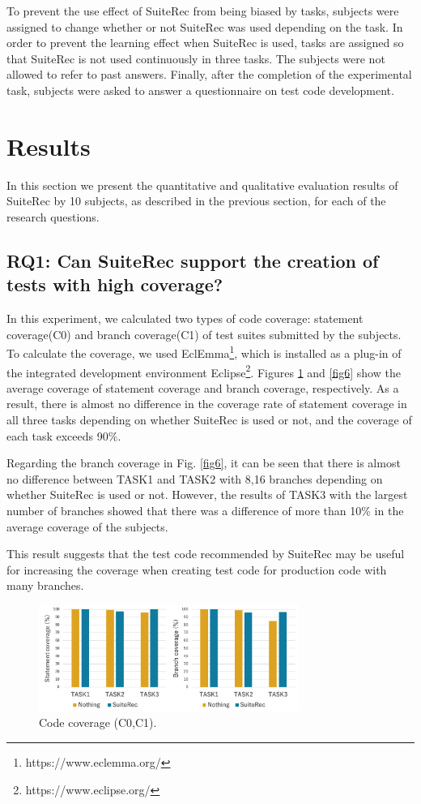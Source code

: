 \documentclass[conference]{IEEEtran}
\begin{document}
To prevent the use effect of SuiteRec from being biased by tasks, subjects were assigned to change whether or not SuiteRec was used depending on the task. In order to prevent the learning effect when SuiteRec is used, tasks are assigned so that SuiteRec is not used continuously in three tasks. The subjects were not allowed to refer to past answers. Finally, after the completion of the experimental task, subjects were asked to answer a questionnaire on test code development.

\section{Results}
In this section we present the quantitative and qualitative evaluation results of SuiteRec by 10 subjects, as described in the previous section, for each of the research questions.

\subsection{RQ1: Can SuiteRec support the creation of tests with high coverage?}
In this experiment, we calculated two types of code coverage: statement coverage(C0) and branch coverage(C1) of test suites submitted by the subjects. To calculate the coverage, we used EclEmma\footnote[1]{https://www.eclemma.org/}, which is installed as a plug-in of the integrated development environment Eclipse\footnote[2]{https://www.eclipse.org/}. Figures \ref{fig5} and \ref{fig6} show the average coverage of statement coverage and branch coverage, respectively. As a result, there is almost no difference in the coverage rate of statement coverage in all three tasks depending on whether SuiteRec is used or not, and the coverage of each task exceeds 90\%.

Regarding the branch coverage in Fig. \ref{fig6}, it can be seen that there is almost no difference between TASK1 and TASK2 with 8,16 branches depending on whether SuiteRec is used or not. However, the results of TASK3 with the largest number of branches showed that there was a difference of more than 10\% in the average coverage of the subjects.

This result suggests that the test code recommended by SuiteRec may be useful for increasing the coverage when creating test code for production code with many branches.

\begin{figure}[htbp]
\centerline{\includegraphics[width=8.5cm]{coverage.pdf}}
\caption{Code coverage (C0,C1).}
\label{fig5}
\end{figure}
\end{document}
